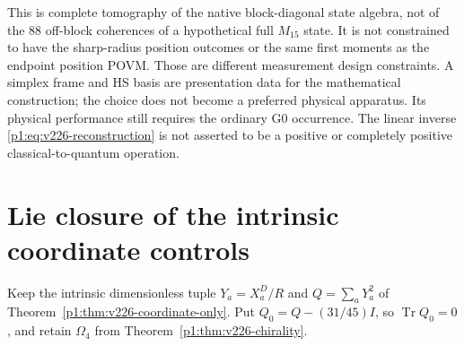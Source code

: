 \documentclass[11pt]{article}
\begin{document}
\begin{remark}
This is complete tomography of the native block-diagonal state algebra,
not of the $88$ off-block coherences of a hypothetical full $M_{15}$ state.
It is not constrained to have the sharp-radius position outcomes or the
same first moments as the endpoint position POVM. Those are different
measurement design constraints. A simplex frame and HS basis are
presentation data for the mathematical construction; the choice does not
become a preferred physical apparatus. Its physical performance still
requires the ordinary G0 occurrence. The linear inverse
\eqref{p1:eq:v226-reconstruction} is not asserted to be a positive or completely
positive classical-to-quantum operation.
\end{remark}

\section{Lie closure of the intrinsic coordinate controls}
\label{p1:sec:v226-control-lie}
Keep the intrinsic dimensionless tuple $Y_a=X_a^D/R$ and
$Q=\sum_aY_a^2$ of Theorem~\ref{p1:thm:v226-coordinate-only}.
Put $Q_0=Q-(31/45)I$, so $\operatorname{Tr}Q_0=0$, and retain
$\Omega_4$ from Theorem~\ref{p1:thm:v226-chirality}.
\end{document}
